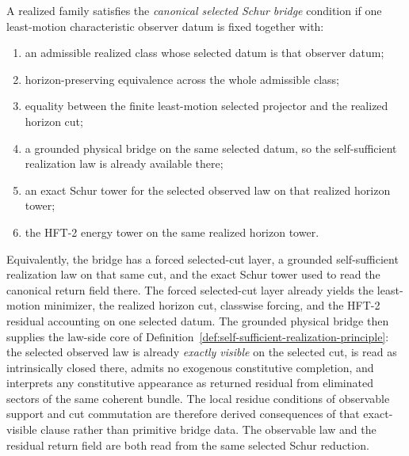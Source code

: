 \begin{definition}
\label{def:canonical-selected-schur-bridge}
A realized family satisfies the \emph{canonical selected Schur bridge}
condition if one least-motion characteristic observer datum is fixed together
with:
\begin{enumerate}[label=(\roman*), leftmargin=2em, itemsep=0.2em]
\item an admissible realized class whose selected datum is that observer datum;
\item horizon-preserving equivalence across the whole admissible class;
\item equality between the finite least-motion selected projector and the
      realized horizon cut;
\item a grounded physical bridge on the same selected datum, so the
      self-sufficient realization law is already available there;
\item an exact Schur tower for the selected observed law on that realized
      horizon tower;
\item the HFT-2 energy tower on the same realized horizon tower.
\end{enumerate}
Equivalently, the bridge has a forced selected-cut layer, a grounded
self-sufficient realization law on that same cut, and the exact Schur tower
used to read the canonical return field there. The forced selected-cut layer
already yields the least-motion minimizer, the realized horizon cut,
classwise forcing, and the HFT-2 residual accounting on one selected datum.
The grounded physical bridge then supplies the law-side core of
Definition~\ref{def:self-sufficient-realization-principle}: the selected
observed law is already \emph{exactly visible} on the selected cut, is read as
intrinsically closed there, admits no exogenous constitutive completion, and
interprets any constitutive appearance as returned residual from eliminated
sectors of the same coherent bundle. The local residue conditions of
observable support and cut commutation are therefore derived consequences of
that exact-visible clause rather than primitive bridge data. The observable
law and the residual return field are both read from the same selected Schur
reduction.
\end{definition}

